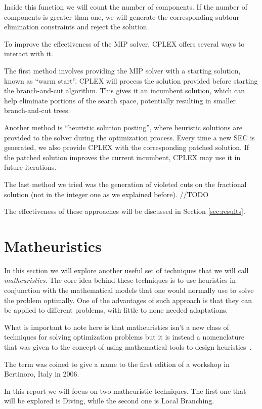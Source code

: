 \documentclass{article}
\begin{document}
Inside this function we will count the number of components. If the number of
components is greater than one, we will generate the corresponding subtour
elimination constraints and reject the solution.

To improve the effectiveness of the MIP solver, CPLEX offers several
ways to interact with it.

The first method involves providing the MIP solver with a starting solution, known as ``warm start''.
CPLEX will process the solution provided before starting the branch-and-cut algorithm.
This gives it an incumbent solution, which can help eliminate portions
of the search space, potentially resulting in smaller branch-and-cut trees.

Another method is ``heuristic solution posting'', where heuristic solutions are provided to the solver
during the optimization process. Every time a new SEC is generated, we also provide CPLEX with
the corresponding patched solution. If the patched solution improves the current incumbent, CPLEX
may use it in future iterations.

The last method we tried was the generation of violeted cuts on the fractional solution
(not in the integer one as we explained before). //TODO

The effectiveness of these approaches will be discussed in Section \ref{sec:results}.
\newpage

\section{Matheuristics}
In this section we will explore another useful set of techniques that we will call
\textit{matheuristics}.
The core idea behind these techniques is to use heuristics in conjunction with the
mathematical models that one would normally use to solve the problem optimally.
One of the advantages of such approach is that they can be applied to different problems,
with little to none needed adaptations.

What is important to note here is that matheuristics isn't a new class of techniques
for solving optimization problems but it is instead a nomenclature that was given
to the concept of using mathematical tools to design heuristics~\cite{boschetti2022matheuristics}.

The term was coined to give a name to the first edition of a workshop in Bertinoro, Italy
in 2006.

In this report we will focus on two matheuristic techniques.
The first one that will be explored is Diving, while the second one is Local Branching.
\end{document}
